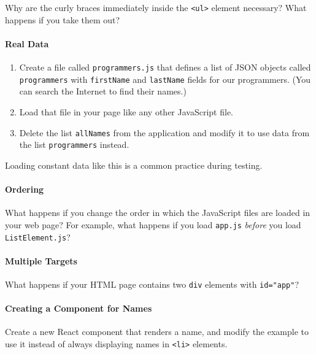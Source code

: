 Why are the curly braces immediately inside the
\texttt{\textless{}ul\textgreater{}} element necessary? What happens if
you take them out?

\paragraph{Real Data}\label{real-data}

\begin{enumerate}
\tightlist
\item
  Create a file called \texttt{programmers.js} that defines a list of
  JSON objects called \texttt{programmers} with \texttt{firstName} and
  \texttt{lastName} fields for our programmers. (You can search the
  Internet to find their names.)
\item
  Load that file in your page like any other JavaScript file.
\item
  Delete the list \texttt{allNames} from the application and modify it
  to use data from the list \texttt{programmers} instead.
\end{enumerate}

Loading constant data like this is a common practice during testing.

\paragraph{Ordering}\label{ordering}

What happens if you change the order in which the JavaScript files are
loaded in your web page? For example, what happens if you load
\texttt{app.js} \emph{before} you load \texttt{ListElement.js}?

\paragraph{Multiple Targets}\label{multiple-targets}

What happens if your HTML page contains two \texttt{div} elements with
\texttt{id="app"}?

\paragraph{Creating a Component for
Names}\label{creating-a-component-for-names}

Create a new React component that renders a name, and modify the example
to use it instead of always displaying names in
\texttt{\textless{}li\textgreater{}} elements.

